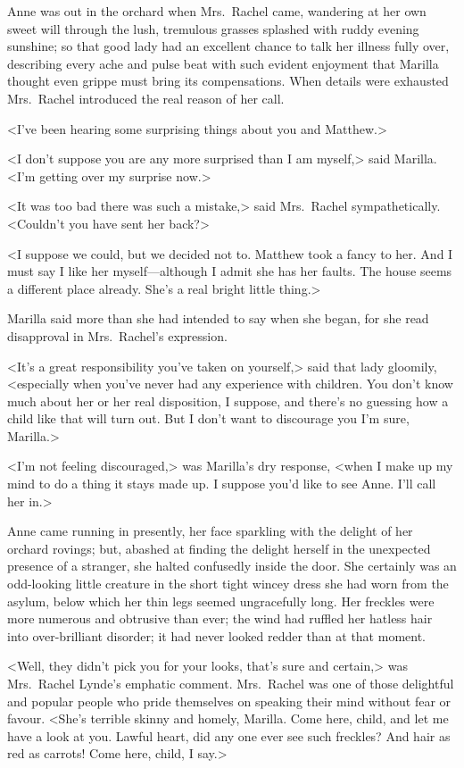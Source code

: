 Anne was out in the orchard when Mrs.~Rachel came, wandering at her own sweet will through the lush, tremulous grasses splashed with ruddy evening sunshine; so that good lady had an excellent chance to talk her illness fully over, describing every ache and pulse beat with such evident enjoyment that Marilla thought even grippe must bring its compensations. When details were exhausted Mrs.~Rachel introduced the real reason of her call.

<I've been hearing some surprising things about you and Matthew.>

<I don't suppose you are any more surprised than I am myself,> said Marilla. <I'm getting over my surprise now.>

<It was too bad there was such a mistake,> said Mrs.~Rachel sympathetically. <Couldn't you have sent her back?>

<I suppose we could, but we decided not to. Matthew took a fancy to her. And I must say I like her myself—although I admit she has her faults. The house seems a different place already. She's a real bright little thing.>

Marilla said more than she had intended to say when she began, for she read disapproval in Mrs.~Rachel's expression.

<It's a great responsibility you've taken on yourself,> said that lady gloomily, <especially when you've never had any experience with children. You don't know much about her or her real disposition, I suppose, and there's no guessing how a child like that will turn out. But I don't want to discourage you I'm sure, Marilla.>

<I'm not feeling discouraged,> was Marilla's dry response, <when I make up my mind to do a thing it stays made up. I suppose you'd like to see Anne. I'll call her in.>

Anne came running in presently, her face sparkling with the delight of her orchard rovings; but, abashed at finding the delight herself in the unexpected presence of a stranger, she halted confusedly inside the door. She certainly was an odd-looking little creature in the short tight wincey dress she had worn from the asylum, below which her thin legs seemed ungracefully long. Her freckles were more numerous and obtrusive than ever; the wind had ruffled her hatless hair into over-brilliant disorder; it had never looked redder than at that moment.

<Well, they didn't pick you for your looks, that's sure and certain,> was Mrs.~Rachel Lynde's emphatic comment. Mrs.~Rachel was one of those delightful and popular people who pride themselves on speaking their mind without fear or favour. <She's terrible skinny and homely, Marilla. Come here, child, and let me have a look at you. Lawful heart, did any one ever see such freckles? And hair as red as carrots! Come here, child, I say.>

